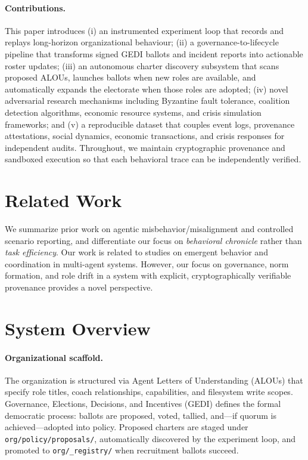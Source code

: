 \documentclass[11pt]{article}
\begin{document}
\paragraph{Contributions.} This paper introduces (i) an instrumented experiment loop that records and replays long-horizon organizational behaviour; (ii) a governance-to-lifecycle pipeline that transforms signed GEDI ballots and incident reports into actionable roster updates; (iii) an autonomous charter discovery subsystem that scans proposed ALOUs, launches ballots when new roles are available, and automatically expands the electorate when those roles are adopted; (iv) novel adversarial research mechanisms including Byzantine fault tolerance, coalition detection algorithms, economic resource systems, and crisis simulation frameworks; and (v) a reproducible dataset that couples event logs, provenance attestations, social dynamics, economic transactions, and crisis responses for independent audits. Throughout, we maintain cryptographic provenance and sandboxed execution so that each behavioral trace can be independently verified.

\section{Related Work}
We summarize prior work on agentic misbehavior/misalignment and controlled scenario reporting,
and differentiate our focus on \emph{behavioral chronicle} rather than \emph{task efficiency}.
Our work is related to studies on emergent behavior and coordination in multi-agent systems. However, our focus on governance, norm formation, and role drift in a system with explicit, cryptographically verifiable provenance provides a novel perspective.

\section{System Overview}
\paragraph{Organizational scaffold.} The organization is structured via Agent Letters of Understanding (ALOUs) that specify role titles, coach relationships, capabilities, and filesystem write scopes. Governance, Elections, Decisions, and Incentives (GEDI) defines the formal democratic process: ballots are proposed, voted, tallied, and—if quorum is achieved—adopted into policy. Proposed charters are staged under \texttt{org/policy/proposals/}, automatically discovered by the experiment loop, and promoted to \texttt{org/\_registry/} when recruitment ballots succeed.
\end{document}
